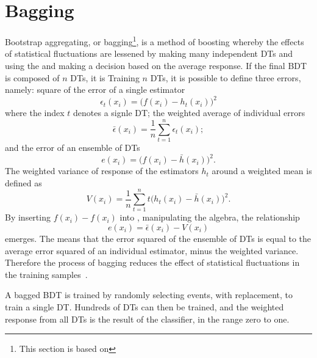 \section{Bagging}
\label{sec:bdt:bag}
Bootstrap aggregating, or bagging\footnote{
  This section is based on }, is a method of boosting whereby the effects of
statistical fluctuations are lessened by making many independent DTs and using the
and making a decision based on the average response.
If the final BDT is composed of $n$ DTs, it is
Training $n$ DTs, it is possible to define three errors, namely:
square of the error of a single estimator
\begin{equation}
  \epsilon_t(x_i) = \big(f(x_i)-h_t(x_i)\big)^2
  \label{eq:bdt:bag1}
\end{equation}
where the index $t$ denotes a signle DT;
the weighted average of individual errors
\begin{equation}
  \bar\epsilon(x_i) = \frac1n\sum_{t=1}^n\epsilon_t(x_i);
  \label{eq:bdt:bag2}
\end{equation}
and the error of an ensemble of DTs
\begin{equation}
  e(x_i) = \big(f(x_i)-\bar h(x_i)\big)^2.
  \label{eq:bdt:bag3}
\end{equation}
The weighted variance of response of the estimators $h_t$ around a weighted mean is defined as
\begin{equation}
  V(x_i) = \frac1n\sum_{t=1}^nt\big(h_t(x_i) - \bar h(x_i)\big)^2.
  \label{eq:bdt:bag4}
\end{equation}
By inserting $f(x_i)-f(x_i)$ into , manipulating the algebra, the relationship
\begin{equation}
  e(x_i) = \bar\epsilon(x_i) - V(x_i)
  \label{eq:bdt:bag5}
\end{equation}
emerges.
The means that the error squared of the ensemble of DTs is equal to the average error squared of an
individual estimator, minus the weighted variance.
Therefore the process of bagging reduces the
effect of statistical fluctuations in the training samples~\cite{Krogh95neuralnetwork}.

A bagged BDT is trained by randomly selecting events, with replacement, to train a single DT.
Hundreds of DTs can then be trained, and the weighted response from all DTs is the result of the
classifier, in the range zero to one.





